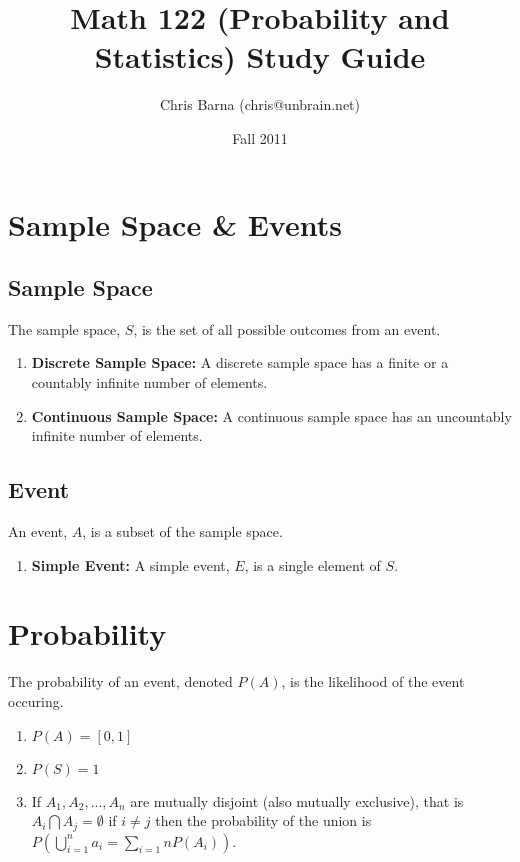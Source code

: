 \documentclass{article}
\begin{document}
\title{Math 122 (Probability and Statistics) Study Guide}
\author{Chris Barna (chris@unbrain.net)}
\date{Fall 2011}

\maketitle

\section{Sample Space \& Events}

\subsection{Sample Space}
The sample space, $S$, is the set of all possible outcomes from an event.

\begin{enumerate}
\item \textbf{Discrete Sample Space:}
  A discrete sample space has a finite or a countably infinite number of
  elements.
\item \textbf{Continuous Sample Space:}
  A continuous sample space has an uncountably infinite number of elements.
\end{enumerate}

\subsection{Event}
An event, $A$, is a subset of the sample space.

\begin{enumerate}
\item \textbf{Simple Event:}
  A simple event, $E$, is a single element of $S$.
\end{enumerate}

\section{Probability}
The probability of an event, denoted $P(A)$, is the likelihood of the event
occuring.

\begin{enumerate}
\item $P(A) = [0, 1]$
\item $P(S) = 1$
\item If $A_1, A_2, ..., A_n$ are mutually disjoint (also mutually exclusive),
that is $A_i \bigcap A_j = \emptyset$ if $i \ne j$ then the probability of the
union is $P(\bigcup_{i=1}^{n}a_i = \sum_{i=1}{n}P(A_i))$.
\end{enumerate}
\end{document}
